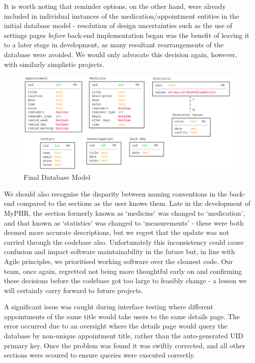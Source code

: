 \documentclass{l3proj}
\begin{document}
It is worth noting that reminder options, on the other hand, were already included in individual instances of the medication/appointment entities in the initial database model - resolution of design uncertainties such as the use of settings pages \textit{before} back-end implementation began was the benefit of leaving it to a later stage in development, as many resultant rearrangements of the database were avoided. We would only advocate this decision again, however, with similarly simplistic projects. 

\begin{figure}[ht]
  \includegraphics[width=\linewidth]{figures/final_db.png}
  \caption{Final Database Model}
  \label{fig:final_db}
\end{figure}

We should also recognise the disparity between naming conventions in the back-end compared to the sections as the user knows them. Late in the development of MyPHR, the section formerly known as `medicine' was changed to `medication', and that known as `statistics' was changed to `measurements' - these were both deemed more accurate descriptions, but we regret that the update was not carried through the codebase also. Unfortunately this inconsistency could cause confusion and impact software maintainability in the future but, in line with Agile principles, we prioritised working software over the cleanest code. Our team, once again, regretted not being more thoughtful early on and confirming these decisions before the codebase got too large to feasibly change - a lesson we will certainly carry forward to future projects.

A significant issue was caught during interface testing where different appointments of the same title would take users to the same details page. The error occurred due to an oversight where the details page would query the database by non-unique appointment title, rather than the auto-generated UID primary key. Once the problem was found it was swiftly corrected, and all other sections were scoured to ensure queries were executed correctly. 
\end{document}

